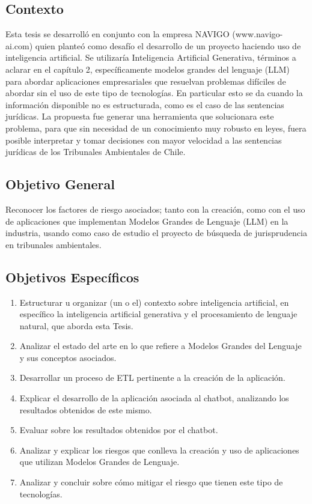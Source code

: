 \subsection{Contexto}
Esta tesis se desarrolló en conjunto con la empresa NAVIGO (www.navigo-ai.com) quien planteó como desafío el desarrollo de un proyecto haciendo uso de inteligencia artificial. Se utilizaría Inteligencia Artificial Generativa, términos a aclarar en el capítulo 2, específicamente modelos grandes del lenguaje (LLM) para abordar aplicaciones empresariales que resuelvan problemas difíciles de abordar sin el uso de este tipo de tecnologías. En particular esto se da cuando la información disponible no es estructurada, como es el caso de las sentencias jurídicas. La propuesta fue generar una herramienta que solucionara este problema, para que sin necesidad de un conocimiento muy robusto en leyes, fuera posible interpretar y tomar decisiones con mayor velocidad a las sentencias jurídicas de los Tribunales Ambientales de Chile.

\subsection{Objetivo General}
Reconocer los factores de riesgo asociados; tanto con la creación, como con el uso de aplicaciones que implementan Modelos 
Grandes de Lenguaje (LLM) en la industria, usando como caso de estudio el proyecto de búsqueda de jurisprudencia en tribunales ambientales. 

\subsection{Objetivos Específicos}

\begin{enumerate}
    \item Estructurar u organizar (un o el) contexto sobre inteligencia artificial, en específico la inteligencia artificial generativa y el procesamiento de lenguaje natural, que aborda esta Tesis. 
    \item Analizar el estado del arte en lo que refiere a Modelos Grandes del Lenguaje y sus conceptos asociados.
    \item Desarrollar un proceso de ETL pertinente a la creación de la aplicación.
    \item Explicar el desarrollo de la aplicación asociada al chatbot, analizando los resultados obtenidos de este mismo.
    \item Evaluar sobre los resultados obtenidos por el chatbot.
    \item Analizar y explicar los riesgos que conlleva la creación y uso de aplicaciones que utilizan Modelos Grandes de Lenguaje. 
    \item Analizar y concluir sobre cómo mitigar el riesgo que tienen este tipo de tecnologías.
\end{enumerate}


